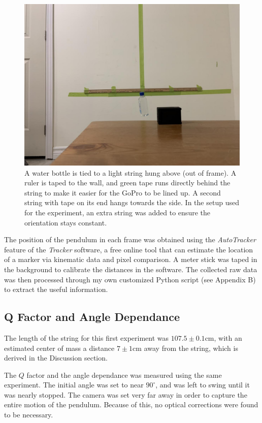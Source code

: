 \documentclass[%
 reprint,
 amsmath,amssymb
 aps,
]{revtex4-2}
\begin{document}
\begin{figure}[!h]
    \includegraphics[width=\linewidth]{setup.jpg}
    \caption{A water bottle is tied to a light string hung above (out of frame). A ruler is taped to the wall, and green tape runs directly behind the string to make it easier for the GoPro to be lined up. A second string with tape on its end hangs towards the side. In the setup used for the experiment, an extra string was added to ensure the orientation stays constant.}
    \label{fig:setup}
\end{figure}
The position of the pendulum in each frame was obtained using the \textit{AutoTracker} feature of the \textit{Tracker} software\cite{tracker}, a free online tool that can estimate the location of a marker via kinematic data and pixel comparison. A meter stick was taped in the background to calibrate the distances in the software. The collected raw data was then processed through my own customized Python script (see Appendix B) to extract the useful information.
\subsection{Q Factor and Angle Dependance}
The length of the string for this first experiment was $107.5 \pm 0.1\si{\centi\meter}$, with an estimated center of mass a distance $7 \pm 1\si{\centi\meter}$ away from the string, which is derived in the Discussion section.

The $Q$ factor and the angle dependance was measured using the same experiment. The initial angle was set to near $90^\circ$, and was left to swing until it was nearly stopped. The camera was set very far away in order to capture the entire motion of the pendulum. Because of this, no optical corrections were found to be necessary.
\end{document}
